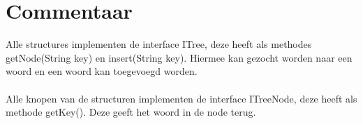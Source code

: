 \chapter{Commentaar}

Alle structures implementen de interface ITree, deze heeft als methodes getNode(String key) en insert(String key). Hiermee kan gezocht worden naar een woord en een woord kan toegevoegd worden.\\
\\
Alle knopen van de structuren implementen de interface ITreeNode, deze heeft als methode getKey(). Deze geeft het woord in de node terug.

